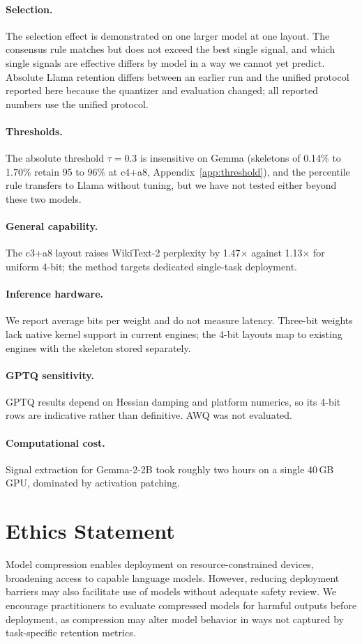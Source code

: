 \documentclass[11pt]{article}
\begin{document}
\paragraph{Selection.} The selection effect is demonstrated on 
one larger model at one layout. The consensus rule matches but 
does not exceed the best single signal, and which single signals 
are effective differs by model in a way we cannot yet predict. 
Absolute Llama retention differs between an earlier run and 
the unified protocol reported here because the quantizer and 
evaluation changed; all reported numbers use the unified 
protocol.
\paragraph{Thresholds.} The absolute threshold $\tau{=}0.3$ is 
insensitive on Gemma (skeletons of 0.14\% to 1.70\% retain 95 
to 96\% at c4+a8, Appendix~\ref{app:threshold}), and the 
percentile rule transfers to Llama without tuning, but we have 
not tested either beyond these two models.
\paragraph{General capability.} The c3+a8 layout raises 
WikiText-2 perplexity by 1.47$\times$ against 1.13$\times$ for 
uniform 4-bit; the method targets dedicated single-task 
deployment.
\paragraph{Inference hardware.} We report average bits per 
weight and do not measure latency. Three-bit weights lack 
native kernel support in current engines; the 4-bit layouts map 
to existing engines with the skeleton stored separately.
\paragraph{GPTQ sensitivity.} GPTQ results depend on Hessian 
damping and platform numerics, so its 4-bit rows are indicative 
rather than definitive. AWQ was not evaluated.
\paragraph{Computational cost.} Signal extraction for 
Gemma-2-2B took roughly two hours on a single 40\,GB GPU, 
dominated by activation patching.

\section*{Ethics Statement}
Model compression enables deployment on resource-constrained 
devices, broadening access to capable language models. However, 
reducing deployment barriers may also facilitate use of models 
without adequate safety review. We encourage practitioners to 
evaluate compressed models for harmful outputs before 
deployment, as compression may alter model behavior in ways not 
captured by task-specific retention metrics.
\end{document}
